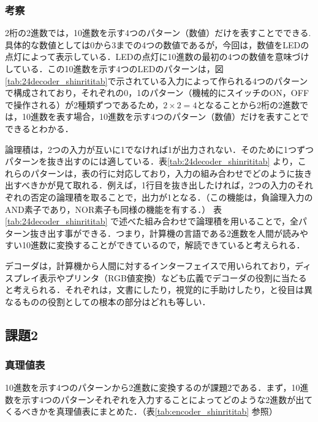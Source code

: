 \subsubsection{考察}
\label{24decoder_consideration}
2桁の2進数では，10進数を示す4つのパターン（数値）だけを表すことでできる.具体的な数値としては0から3までの4つの数値であるが，今回は，数値をLEDの点灯によって表示している．LEDの点灯に10進数の最初の4つの数値を意味づけしている．この10進数を示す4つのLEDのパターンは，図\ref{tab:24decoder_shinrititab}で示されている入力によって作られる4つのパターンで構成されており，それぞれの0，1のパターン（機械的にスイッチのON，OFFで操作される）が2種類ずつであるため，$2\times2=4$となることから2桁の2進数では，10進数を表す場合，10進数を示す4つのパターン（数値）だけを表すことでできるとわかる．

論理積は，2つの入力が互いに1でなければ1が出力されない．そのために1つずつパターンを抜き出すのには適している．表\ref{tab:24decoder_shinrititab} より，これらのパターンは，表の行に対応しており，入力の組み合わせでどのように抜き出すべきかが見て取れる．例えば，1行目を抜き出したければ，2つの入力のそれぞれの否定の論理積を取ることで，出力が1となる．（この機能は，負論理入力のAND素子であり，NOR素子も同様の機能を有する．）  表\ref{tab:24decoder_shinrititab} で述べた組み合わせで論理積を用いることで，全パターン抜き出す事ができる．つまり，計算機の言語である2進数を人間が読みやすい10進数に変換することができているので，解読できていると考えられる．

デコーダは，計算機から人間に対するインターフェイスで用いられており，ディスプレイ表示やプリンタ（RGB値変換）なども広義でデコーダの役割に当たると考えられる．それぞれは，文書にしたり，視覚的に手助けしたり，と役目は異なるものの役割としての根本の部分はどれも等しい．
%
%
\subsection{課題2}
\label{24decoder_kadai2}

%
%
\subsubsection{真理値表}
10進数を示す4つのパターンから2進数に変換するのが課題2である．まず，10進数を示す4つのパターンそれぞれを入力することによってどのような2進数が出てくるべきかを真理値表にまとめた．（表\ref{tab:encoder_shinrititab} 参照）

